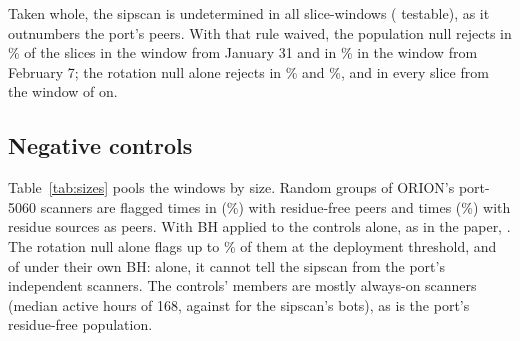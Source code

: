 \documentclass[11pt]{article}
\begin{document}
\begin{table}[t]
\centering
\caption{Sipscan sub-campaigns flagged per 7-day window, in percent of \SipPerCell{} per cell: the
two-null test with residue-free peers (RF, the default) and with all port-5060 peers, residue
sources included (RP), and the rotation null alone (Rot.). ``Holds'': phases of the scan inside the window.}
\label{tab:windows}
\small
\setlength{\tabcolsep}{3.6pt}

\end{table}

Taken whole, the sipscan is undetermined in all \SipSliceWindows{} slice-windows
(\SipFullTestable{} testable), as it outnumbers the port's peers. With that rule waived, the
population null rejects in \SipFullPopFirst\% of the slices in the window from January 31 and in
\SipFullPopLast\% in the window from February 7; the rotation null alone rejects in
\SipFullRotFirst\% and \SipFullRotLast\%, and in every slice from the window of \SipFullRotFrom{}
on.

\subsection{Negative controls}
Table~\ref{tab:sizes} pools the windows by size. Random groups of ORION's port-5060 scanners are
flagged \SipCtlFlag{} times in \SipCtlTotal{} (\SipCtlFlagPct\%) with residue-free peers and
\SipCtlFlagRP{} times (\SipCtlFlagRPPct\%) with residue sources as peers. With BH applied to the
controls alone, as in the paper, \SipCtlOwnBHText. The rotation null alone flags up
to \SipCtlRotMax\% of them at the deployment threshold, and \SipCtlOwnBHRot{} of \SipCtlTotal{}
under their own BH: alone, it cannot tell the sipscan from the port's independent scanners. The
controls' members are mostly always-on scanners (median \SipCtlNactMed{} active hours of 168,
against \SipNactMed{} for the sipscan's bots), as is the port's residue-free population.

\begin{table}[t]
\centering
\caption{Flagged share in percent, over all eight windows, by group size: sipscan sub-campaigns
(``sipscan'') and random groups of ORION's residue-free port-5060 sources, under the same test, peers and
threshold (RF: residue-free peers, the default; RP: all port-5060 peers, residue sources
included; Rot.: rotation null alone).}
\label{tab:sizes}
\small

\end{table}
\end{document}
